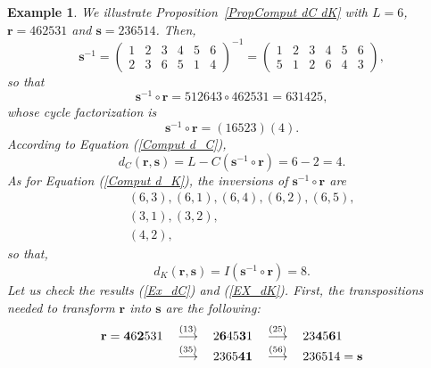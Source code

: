 \documentclass{article}
\newtheorem{example}[theorem]{Example}
\begin{document}
\begin{example}
We illustrate Proposition~\ref{PropComput dC dK} with $L=6$, $\mathbf{r}%
=462531$ and $\mathbf{s} = 236514$. Then,%
\begin{equation*}
\mathbf{s}^{-1}=\left( 
\begin{array}{cccccc}
1 & 2 & 3 & 4 & 5 & 6 \\ 
2 & 3 & 6 & 5 & 1 & 4%
\end{array}%
\right) ^{-1}=\left( 
\begin{array}{cccccc}
1 & 2 & 3 & 4 & 5 & 6 \\ 
5 & 1 & 2 & 6 & 4 & 3%
\end{array}%
\right) ,
\end{equation*}%
so that%
\begin{equation*}
\mathbf{s}^{-1}\circ \mathbf{r}=512643\circ 462531=631425,
\end{equation*}%
whose cycle factorization is 
\begin{equation*}
\mathbf{s}^{-1}\circ \mathbf{r}=(16523)(4).
\end{equation*}%
According to Equation (\ref{Comput d_C}), 
\begin{equation}
d_{C}(\mathbf{r},\mathbf{s})=L-C(\mathbf{s}^{-1}\circ \mathbf{r})=6-2=4.
\label{Ex_dC}
\end{equation}%
As for Equation (\ref{Comput d_K}), the inversions of $\mathbf{s}^{-1}\circ 
\mathbf{r}$ are 
\begin{eqnarray*}
&&(6,3),(6,1),(6,4),(6,2),(6,5), \\
&&(3,1),(3,2), \\
&&(4,2),
\end{eqnarray*}%
so that, 
\begin{equation}
d_{K}(\mathbf{r},\mathbf{s})=I(\mathbf{s}^{-1}\circ \mathbf{r})=8.
\label{EX_dK}
\end{equation}%
Let us check the results (\ref{Ex_dC}) and (\ref{EX_dK}). First, the
transpositions needed to transform $\mathbf{r}$ into $\mathbf{s}$ are the
following:%
\begin{equation*}
\begin{tabular}{lllll}
$\mathbf{r}=\mathbf{4}6\mathbf{2}531$ & $\overset{(13)}{\longrightarrow }$ & 
$2\mathbf{6}45\mathbf{3}1$ & $\overset{(25)}{\longrightarrow }$ & $23\mathbf{%
4}5\mathbf{6}1$ \\ 
& $\overset{(35)}{\longrightarrow }$ & $2365\mathbf{41}$ & $\overset{(56)}{%
\longrightarrow }$ & $236514=\mathbf{s}$%
\end{tabular}%
\end{equation*}%

\end{example}
\end{document}

